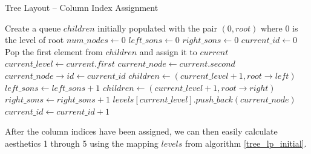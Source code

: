 \documentclass[11pt]{report}
\begin{document}
\begin{algorithm}[H]
    \caption{Tree Layout -- Column Index Assignment}
    \label{tree_lp_initial}
    \begin{algorithmic}[1]
        \State Create a queue $children$ initially populated with the pair $(0, root)$ where 0 is the level of root
        \State $num\_nodes \gets 0$ 
        \State $left\_sons \gets 0$
        \State $right\_sons \gets 0$
        \State $current\_id \gets 0$ 
         
        \State Pop the first element from $children$ and assign it to $current$
        \State $current\_level \gets current.first$
        \State $current\_node \gets current.second$
        \State $current\_node\rightarrow id \gets current\_id$
            \State $children \gets (current\_level + 1, root\rightarrow left)$ 
            \State $left\_sons \gets left\_sons + 1$ 
            \EndIf
            \State $children \gets (current\_level + 1, root\rightarrow right)$ 
            \State $right\_sons \gets right\_sons + 1$ 
            \EndIf
        \State $levels[current\_level].push\_back(current\_node)$
        \State $current\_id \gets current\_id + 1$
        \EndWhile
        \EndProcedure
    \end{algorithmic}
\end{algorithm}

After the column indices have been assigned, we can then easily calculate aesthetics 1 through 5 using the mapping $levels$ from algorithm \ref{tree_lp_initial}.
\end{document}
